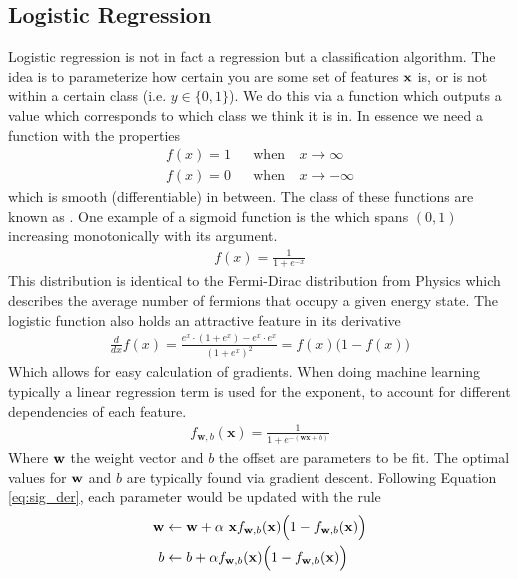 \subsection{Logistic Regression}
Logistic regression is not in fact a regression but a classification algorithm. The idea is to parameterize how certain you are some set of features $\textbf{x}$ is, or is not within a certain class (i.e. $y\in \{0,1\}$). We do this via a function which outputs a value which corresponds to which class we think it is in. In essence we need a function with the properties
\begin{align}
    f(x)=1 &&\textrm{when}&~ x\rightarrow\infty\\
    f(x)=0 &&\textrm{when}&~ x\rightarrow-\infty
\end{align}
which is smooth (differentiable) in between. The class of these functions are known as .  One example of a sigmoid function is the  which spans $(0,1)$ increasing monotonically with its argument.
\begin{align}
	f(x) = \frac{1}{1+e^{-x}}
\end{align}
This distribution is identical to the Fermi-Dirac distribution from Physics which describes the average number of fermions that occupy a given energy state. The logistic function also holds an attractive feature in its derivative
\begin{align}\label{eq:sig_der}
    \frac{d}{dx}f(x) = \frac{e^x\cdot(1+e^x)-e^x\cdot e^x}{(1+e^x)^2} = f(x)\Big(1-f(x)\Big)
\end{align}
Which allows for easy calculation of gradients. When doing machine learning typically a linear regression term is used for the exponent, to account for different dependencies of each feature.
\begin{align}
	f_{\mathbf{w},b}(\mathbf{x}) = \frac{1}{1+e^{-(\mathbf{wx} +b)}}
\end{align}
Where $\textbf{w}$ the weight vector and $b$ the offset are parameters to be fit. The optimal values for $\textbf{w}$ and $b$ are typically found via gradient descent. Following Equation \ref{eq:sig_der}, each parameter would be updated with the rule
\begin{align}
    \textbf{w}&\leftarrow\textbf{w}+\alpha~\textbf{x} f_{\mathbf{w},b}(\mathbf{x}) \Big(1-f_{\mathbf{w},b}(\mathbf{x})\Big)\\
    b&\leftarrow b +\alpha f_{\mathbf{w},b}(\mathbf{x}) \Big(1-f_{\mathbf{w},b}(\mathbf{x})\Big)
\end{align}


